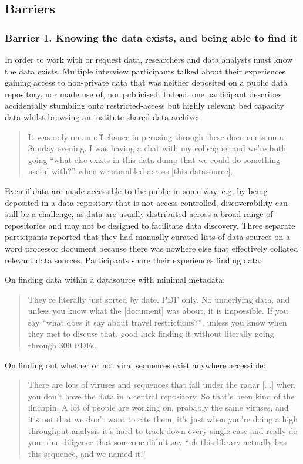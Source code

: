 \documentclass{CUP-JNL-DAP}%
\begin{document}
\subsection{Barriers}

\subsubsection{Barrier 1. Knowing the data exists, and being able to find it}
In order to work with or request data, researchers and data analysts must know the data exists. Multiple interview participants talked about their experiences gaining access to non-private data that was neither deposited on a public data repository, nor made use of, nor publicised. Indeed, one participant describes accidentally stumbling onto restricted-access but highly relevant bed capacity data whilst browsing an institute shared data archive: 

\blockquote{It was only on an off-chance in perusing through these documents on a Sunday evening. I was having a chat with my colleague, and we're both going \enquote{what else exists in this data dump that we could do something useful with?} when we stumbled across [this datasource].}

Even if data are made accessible to the public in some way, e.g. by being deposited in a data repository that is not access controlled, discoverability can still be a challenge, as data are usually distributed across a broad range of repositories and may not be designed to facilitate data discovery. Three separate participants reported that they had manually curated lists of data sources on a word processor document because there was nowhere else that effectively collated relevant data sources. Participants share their experiences finding data: 

On finding data within a datasource with minimal metadata:

\blockquote{They're literally just sorted by date. PDF only. No underlying data, and unless you know what the [document] was about, it is impossible. If you say \enquote{what does it say about travel restrictions?}, unless you know when they met to discuss that, good luck finding it without literally going through 300 PDFs.}

On finding out whether or not viral sequences exist anywhere accessible:

\blockquote{There are lots of viruses and sequences that fall under the radar [...] when you don't have the data in a central repository. So that's been kind of the linchpin. A lot of people are working on, probably the same viruses, and it's not that we don't want to cite them, it's just when you're doing a high throughput analysis it's hard to track down every single case and really do your due diligence that someone didn't say \enquote{oh this library actually has this sequence, and we named it.}}
\end{document}
